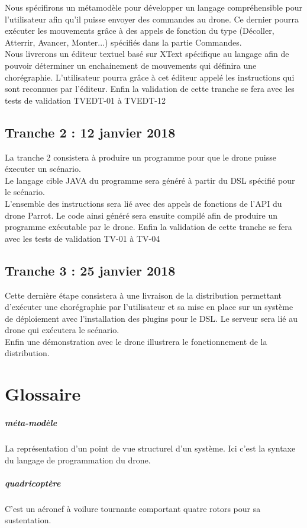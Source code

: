\documentclass[12pt, openany]{report}
\begin{document}
Nous sp\'ecifirons un m\'etamod\`ele pour d\'evelopper un langage compr\'ehensible pour l'utilisateur afin qu'il puisse envoyer des commandes au drone. Ce dernier pourra ex\'ecuter les mouvements gr\^ace \`a des appels de fonction du type (D\'ecoller, Atterrir, Avancer, Monter...) sp\'ecifi\'es dans la partie Commandes.\\
Nous livrerons un éditeur textuel bas\'e sur XText  spécifique au langage afin de pouvoir déterminer un enchainement de mouvements qui d\'efinira une chor\'egraphie. L'utilisateur pourra grâce \`a cet éditeur appel\'e les instructions qui sont reconnues par l'éditeur. Enfin la validation de cette tranche se fera avec les tests de validation TVEDT-01 à TVEDT-12

\section{Tranche 2  : 12 janvier 2018}
\vspace{1px}

La tranche 2 consistera \`a produire un programme pour que le drone puisse \'executer un sc\'enario.\\
Le langage cible JAVA du programme sera g\'en\'er\'e \`a partir du DSL sp\'ecifi\'e pour le sc\'enario.\\
L'ensemble des instructions sera li\'e avec des appels de fonctions de l'API du drone Parrot. Le code ainsi g\'en\'er\'e sera ensuite compil\'e afin de produire un programme ex\'ecutable par le drone. Enfin la validation de cette tranche se fera avec les tests de validation TV-01 à TV-04

\section{Tranche 3 : 25 janvier 2018}
\vspace{1px}

Cette derni\`ere \'etape consistera \`a une livraison de la distribution permettant d'ex\'ecuter une chor\'egraphie par l'utilisateur et sa mise en place sur un syst\`eme de d\'eploiement avec l'installation des plugins pour le DSL.
Le serveur sera li\'e au drone qui ex\'ecutera le sc\'enario. \\
Enfin une d\'emonstration avec le drone illustrera le fonctionnement de la distribution.



\chapter{Glossaire}
\paragraph{méta-modèle} La représentation d'un point de vue structurel d'un système. Ici c'est la syntaxe du langage de programmation du drone. 
\paragraph{quadricoptère} C'est un aéronef à voilure tournante comportant quatre rotors pour sa sustentation.
\end{document}
